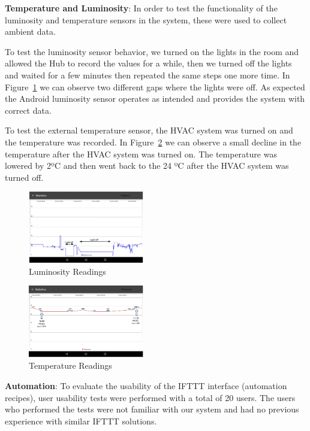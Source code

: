 \documentclass[conference]{IEEEtran}
\begin{document}
\textbf{Temperature and Luminosity}: In order to test the functionality of the luminosity and temperature sensors in the system, these were used to collect ambient data.

To test the luminosity sensor behavior, we turned on the lights in the room and allowed the Hub to record the values for a while, then we turned off the lights and waited for a few minutes then repeated the same steps one more time. In Figure~\ref{eval:lights} we can observe two different gaps where the lights were off. As expected the Android luminosity sensor operates as intended and provides the system with correct data. 

To test the external temperature sensor, the HVAC system was turned on and the temperature was recorded. In Figure~\ref{eval:temp} we can observe a small decline in the temperature after the HVAC system was turned on. The temperature was lowered by 2ºC and then went back to the 24 ºC after the HVAC system was turned off.

\begin{figure}[]
\centering
\includegraphics[width=0.45\textwidth]{Figures/eval_lights}
\caption{Luminosity Readings}
\label{eval:lights}
\end{figure}

\begin{figure}[]
\centering
\includegraphics[width=0.45\textwidth]{Figures/eval_temp}
\caption{Temperature Readings}
\label{eval:temp}
\end{figure}

\textbf{Automation}: To evaluate the usability of the \ac{IFTTT} interface (automation recipes), user usability tests were performed with a total of 20 users. The users who performed the tests were not familiar with our system and had no previous experience with similar \ac{IFTTT} solutions.
\end{document}
